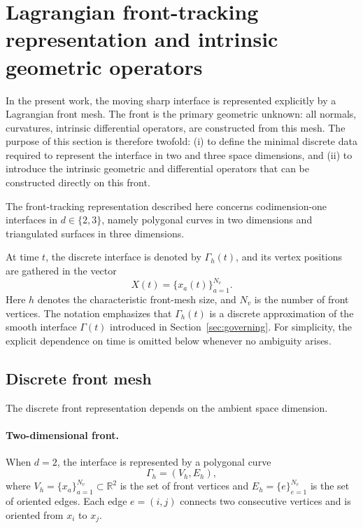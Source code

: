 \documentclass{article}
\begin{document}
\section{Lagrangian front-tracking representation and intrinsic geometric operators}
\label{sec:front_tracking}

In the present work, the moving sharp interface is represented explicitly by a
Lagrangian front mesh. The front is the primary geometric unknown: all normals,
curvatures, intrinsic differential operators, are constructed from this mesh.
The purpose of this section is therefore twofold:
(i) to define the minimal discrete data required to represent the interface in
two and three space dimensions, and
(ii) to introduce the intrinsic geometric and differential operators that can be
constructed directly on this front.

The front-tracking representation described here concerns codimension-one
interfaces in $d\in\{2,3\}$, namely polygonal curves in two dimensions and
triangulated surfaces in three dimensions.

At time $t$, the discrete interface is denoted by $\Gamma_h(t)$, and its vertex
positions are gathered in the vector
\begin{equation}
X(t) = \{x_a(t)\}_{a=1}^{N_v}.
\label{eq:front_vertices}
\end{equation}
Here $h$ denotes the characteristic front-mesh size, and $N_v$ is the number of
front vertices. The notation emphasizes that $\Gamma_h(t)$ is a discrete approximation
of the smooth interface $\Gamma(t)$ introduced in Section~\ref{sec:governing}.
For simplicity, the explicit dependence on time is omitted below whenever no ambiguity arises.

\subsection{Discrete front mesh}
\label{subsec:front_mesh}

The discrete front representation depends on the ambient space dimension.

\paragraph{Two-dimensional front.}
When $d=2$, the interface is represented by a polygonal curve
\begin{equation}
\Gamma_h = (V_h,E_h),
\end{equation}
where $V_h=\{x_a\}_{a=1}^{N_v}\subset\mathbb{R}^2$ is the set of front vertices
and $E_h=\{e\}_{e=1}^{N_e}$ is the set of oriented edges.
Each edge $e=(i,j)$ connects two consecutive vertices and is oriented from $x_i$
to $x_j$.
\end{document}
